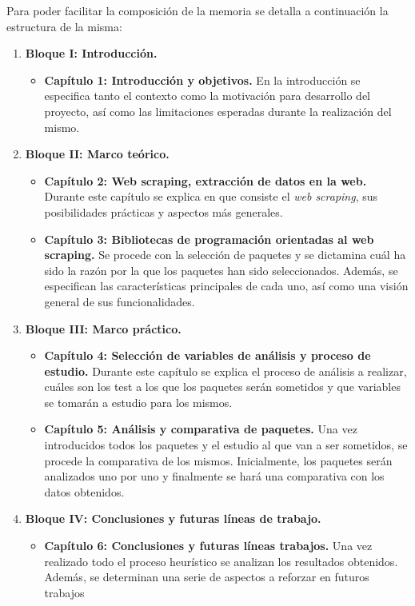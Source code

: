 Para poder facilitar la composición de la memoria se detalla a continuación la estructura de la misma:
\begin{enumerate}
  \item {\bfseries Bloque I: Introducción. }
        \begin{itemize}
          \item {\bfseries Capítulo 1: Introducción y objetivos. \justify}
                En la introducción se especifica tanto el contexto como la motivación para desarrollo del 
                proyecto, así como las limitaciones esperadas durante la realización del mismo.
        \end{itemize}
  \item {\bfseries Bloque II: Marco teórico. }
        \begin{itemize}
          \item {\bfseries Capítulo 2: Web scraping, extracción de datos en la web. \justify}
                Durante este capítulo se explica en que consiste el \emph{web scraping}, sus posibilidades 
                prácticas y aspectos más generales.
          \item {\bfseries Capítulo 3: Bibliotecas de programación orientadas al web scraping. \justify}
                Se procede con la selección de paquetes y se dictamina cuál ha sido la razón por la que los 
                paquetes han sido seleccionados. Además, se especifican las características principales 
                de cada uno, así como una visión general de sus funcionalidades.
        \end{itemize}
  \item {\bfseries Bloque III: Marco práctico. }
        \begin{itemize}
          \item {\bfseries Capítulo 4: Selección de variables de análisis y proceso de estudio. \justify}
                Durante este capítulo se explica el proceso de análisis a realizar, cuáles son los test 
                a los que los paquetes serán sometidos y que variables se tomarán a estudio para los mismos.
          \item {\bfseries Capítulo 5: Análisis y comparativa de paquetes. \justify}
                Una vez introducidos todos los paquetes y el estudio al que van a ser sometidos, se procede 
                la comparativa de los mismos. Inicialmente, los paquetes serán analizados uno por uno y 
                finalmente se hará una comparativa con los datos obtenidos.
        \end{itemize}
  \item {\bfseries Bloque IV: Conclusiones y futuras líneas de trabajo. }
        \begin{itemize}
      \item {\bfseries Capítulo 6: Conclusiones y futuras líneas trabajos. \justify}
            Una vez realizado todo el proceso heurístico se analizan los resultados obtenidos. Además, se
            determinan una serie de aspectos a reforzar en futuros trabajos
        \end{itemize}
\end{enumerate}

